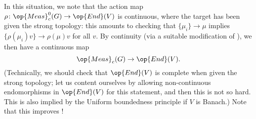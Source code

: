 \documentclass[../notes.tex]{subfiles}
\begin{document}
\begin{remark} \label{rem:cont-extend-action}
	In this situation, we note that the action map $\rho\colon\op{Meas}_c^0(G)\to\op{End}(V)$ is continuous, where the target has been given the strong topology: this amounts to checking that $\{\mu_i\}\to\mu$ implies $\{\rho(\mu_i)v\}\to\rho(\mu)v$ for all $v$. By continuity (via a suitable modification of ), we then have a continuous map
	\[\op{Meas}_c(G)\to\op{End}(V).\]
	(Technically, we should check that $\op{End}(V)$ is complete when given the strong topology; let us content ourselves by allowing non-continuous endomorphisms in $\op{End}(V)$ for this statement, and then this is not so hard. This is also implied by the Uniform boundedness principle if $V$ is Banach.\todo{}) Note that this improves !
\end{remark}
\end{document}

